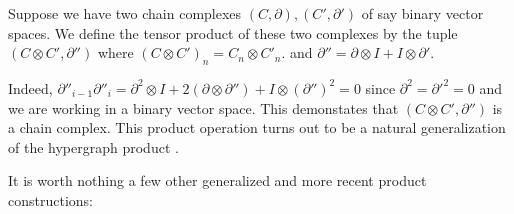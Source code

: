 \documentclass[12pt]{article}%
\theoremstyle{definition}
\begin{document}
\vspace{7pt}
\begin{definition}
  Suppose we have two chain complexes $(C, \partial), (C', \partial')$ of say binary vector spaces. We define the tensor product of these two complexes by the tuple $(C \otimes C',\partial'')$ where $(C \otimes C')_n = C_n \otimes C'_n.$ and $\partial'' = \partial \otimes I + I \otimes \partial'$.
\end{definition}
\vspace{5pt}
%
\noindent Indeed, $\partial''_{i-1}\partial''_{i} = \partial^2 \otimes I + 2(\partial \otimes \partial'') + I \otimes( \partial'')^2 = 0$ since $\partial^2 = \partial'^2 = 0$ and we are working in a binary vector space. This demonstates that $(C \otimes C',\partial'')$ is a chain complex. This product operation turns out to be a natural generalization of the hypergraph product \cite{freedman2013quantum}. \newline

\noindent It is worth nothing a few other generalized and more recent product constructions:
\end{document}
